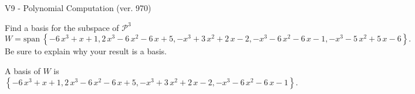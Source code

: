\begin{exercise}
  \begin{exerciseTitle}V9 - Polynomial Computation (ver. 970)\end{exerciseTitle}
  \begin{exerciseStatement}
    Find a basis for the subspace of \(\mathcal{P}^3\) 
\[W=\mathrm{span}\ \left\{-6 \, x^{3} + x + 1 , 2 \, x^{3} - 6 \, x^{2} - 6 \, x + 5 , -x^{3} + 3 \, x^{2} + 2 \, x - 2 , -x^{3} - 6 \, x^{2} - 6 \, x - 1 , -x^{3} - 5 \, x^{2} + 5 \, x - 6\right\}.\]
 Be sure to explain why your result is a basis.


  \end{exerciseStatement}
  \begin{exerciseAnswer}
   A basis of \(W\) is  \(\left\{-6 \, x^{3} + x + 1 , 2 \, x^{3} - 6 \, x^{2} - 6 \, x + 5 , -x^{3} + 3 \, x^{2} + 2 \, x - 2 , -x^{3} - 6 \, x^{2} - 6 \, x - 1\right\}\).
  


  \end{exerciseAnswer}
\end{exercise}